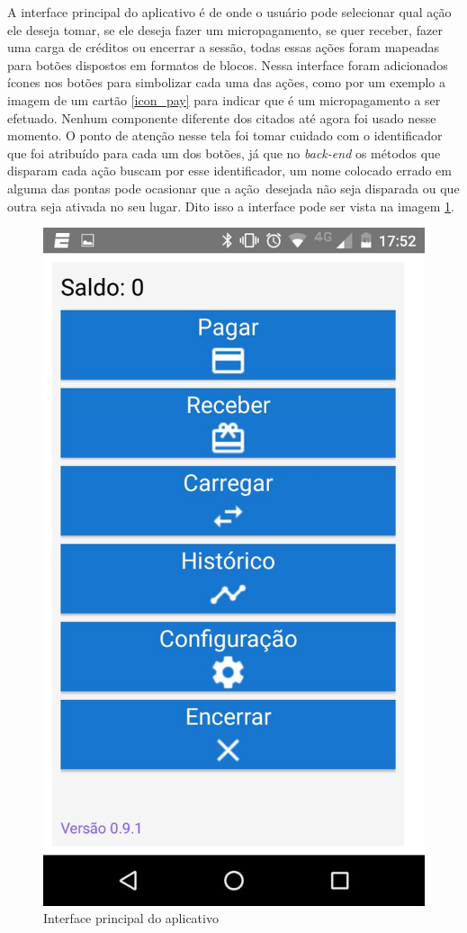 \documentclass[hidelinks,12pt]{article}
\begin{document}
A interface principal do aplicativo \'e de onde o usu\'ario pode selecionar qual a\c{c}\~ao ele deseja tomar, se ele deseja fazer um micropagamento, se quer receber, fazer uma carga de cr\'editos ou encerrar a sess\~ao, todas essas a\c{c}\~oes foram mapeadas para bot\~oes dispostos em formatos de blocos. Nessa interface foram adicionados \'icones nos bot\~oes para simbolizar cada uma das a\c{c}\~oes, como por um exemplo a imagem de um cart\~ao \ref{icon_pay} para indicar que \'e um micropagamento a ser efetuado. Nenhum componente diferente dos citados at\'e agora foi usado nesse momento. O ponto de aten\c{c}\~ao nesse tela foi tomar cuidado com o identificador que foi atribu\'ido para cada um dos bot\~oes, j\'a que no \textit{back-end} os m\'etodos que disparam cada a\c{c}\~ao buscam por esse identificador, um nome colocado errado em alguma das pontas pode ocasionar que a a\c{c}\~ao~desejada n\~ao seja disparada ou que outra seja ativada no seu lugar. Dito isso a interface pode ser vista na imagem \ref{main}.
\begin{figure}[H]
	\centering
	\includegraphics[scale=0.3]{main} 
	\caption{Interface principal do aplicativo}
	\label{main}
\end{figure}
\end{document}
